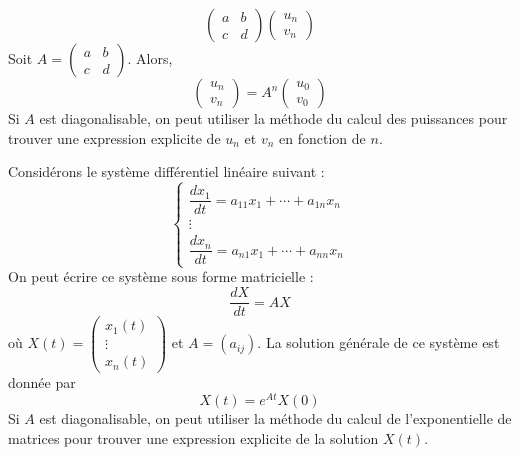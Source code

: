 \documentclass[a4paper, 12pt]{article}
\begin{document}
\begin{description}[leftmargin=!,labelwidth=2.5cm]
$$\begin{pmatrix}
        a & b \\
        c & d
    \end{pmatrix}
    \begin{pmatrix}
        u_n \\
        v_n
    \end{pmatrix}
    $$
    Soit $A = \begin{pmatrix} a & b \\ c & d \end{pmatrix}$.
    Alors,
    $$
    \begin{pmatrix}
        u_n \\
        v_n
    \end{pmatrix}
    = A^n
    \begin{pmatrix}
        u_0 \\
        v_0
    \end{pmatrix}
    $$
    Si $A$ est diagonalisable, on peut utiliser la méthode du calcul des puissances pour trouver une expression explicite de $u_n$ et $v_n$ en fonction de $n$.
    \item[Systèmes différentiels linéaires à coefficients constants]
    Considérons le système différentiel linéaire suivant :
    $$
    \begin{cases}
        \dfrac{dx_1}{dt} = a_{11} x_1 + \cdots + a_{1n} x_n \\
        \vdots \\
        \dfrac{dx_n}{dt} = a_{n1} x_1 + \cdots + a_{nn} x_n
    \end{cases}
    $$
    On peut écrire ce système sous forme matricielle :
    $$
    \dfrac{dX}{dt} = A X
    $$
    où $X(t) = \begin{pmatrix} x_1(t) \\ \vdots \\ x_n(t) \end{pmatrix}$ et $A = (a_{ij})$.
    La solution générale de ce système est donnée par
    $$
    X(t) = e^{At} X(0)
    $$
    Si $A$ est diagonalisable, on peut utiliser la méthode du calcul de l'exponentielle de matrices pour trouver une expression explicite de la solution $X(t)$.
\end{description}
\end{document}

